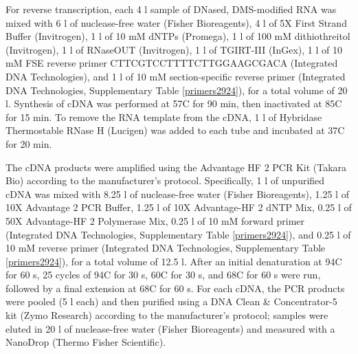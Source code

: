 \documentclass[main.tex]{subfiles}
\begin{document}
For reverse transcription, each 4 \textmu l sample of DNased, DMS-modified RNA was mixed with 6 \textmu l of nuclease-free water (Fisher Bioreagents), 4 \textmu l of 5X First Strand Buffer (Invitrogen), 1 \textmu l of 10 mM dNTPs (Promega), 1 \textmu l of 100 mM dithiothreitol (Invitrogen), 1 \textmu l of RNaseOUT (Invitrogen), 1 \textmu l of TGIRT-III (InGex), 1 \textmu l of 10 mM FSE reverse primer CTTCGTCCTTTTCTTGGAAGCGACA (Integrated DNA Technologies), and 1 \textmu l of 10 mM section-specific reverse primer (Integrated DNA Technologies, Supplementary Table \ref{primers2924}), for a total volume of 20 \textmu l.
Synthesis of cDNA was performed at 57\textdegree C for 90 min, then inactivated at 85\textdegree C for 15 min.
To remove the RNA template from the cDNA, 1 \textmu l of Hybridase Thermostable RNase H (Lucigen) was added to each tube and incubated at 37\textdegree C for 20 min.

The cDNA products were amplified using the Advantage HF 2 PCR Kit (Takara Bio) according to the manufacturer's protocol.
Specifically, 1 \textmu l of unpurified cDNA was mixed with 8.25 \textmu l of nuclease-free water (Fisher Bioreagents), 1.25 \textmu l of 10X Advantage 2 PCR Buffer, 1.25 \textmu l of 10X Advantage-HF 2 dNTP Mix, 0.25 \textmu l of 50X Advantage-HF 2 Polymerase Mix, 0.25 \textmu l of 10 mM forward primer (Integrated DNA Technologies, Supplementary Table \ref{primers2924}), and 0.25 \textmu l of 10 mM reverse primer (Integrated DNA Technologies, Supplementary Table \ref{primers2924}), for a total volume of 12.5 \textmu l.
After an initial denaturation at 94\textdegree C for 60 s, 25 cycles of 94\textdegree C for 30 s, 60\textdegree C for 30 s, and 68\textdegree C for 60 s were run, followed by a final extension at 68\textdegree C for 60 s.
For each cDNA, the PCR products were pooled (5 \textmu l each) and then purified using a DNA Clean \& Concentrator-5 kit (Zymo Research) according to the manufacturer's protocol; samples were eluted in 20 \textmu l of nuclease-free water (Fisher Bioreagents) and measured with a NanoDrop (Thermo Fisher Scientific).
\end{document}
